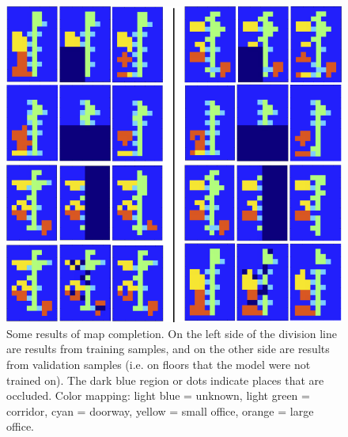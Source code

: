 \documentclass[11pt, titlepage]{article}
\theoremstyle{definition}
\begin{document}
\begin{figure}[!htb]
    \centering
    \captionsetup{width=.8\linewidth}
    \includegraphics[scale=0.8]{images/placegrid_completion.png}
    \caption{Some results of map completion. On the left side of the division line are results from training samples, and on the other side are results from validation samples (i.e. on floors that the model were not trained on). The dark blue region or dots indicate places that are occluded. Color mapping: light blue = unknown, light green = corridor, cyan = doorway, yellow = small office, orange = large office.}
    \label{fig:basic_compl}
\end{figure}
\end{document}
